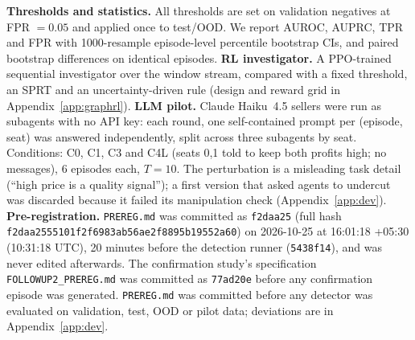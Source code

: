 \documentclass[11pt]{article}
\begin{document}
\textbf{Thresholds and statistics.} All thresholds are set on validation negatives at FPR $=0.05$ and applied once to test/OOD. We report AUROC, AUPRC, TPR and FPR with 1000-resample episode-level percentile bootstrap CIs, and paired bootstrap differences on identical episodes.
\textbf{RL investigator.} A PPO-trained sequential investigator over the window stream, compared with a fixed threshold, an SPRT and an uncertainty-driven rule (design and reward grid in Appendix~\ref{app:graphrl}).
\textbf{LLM pilot.} Claude Haiku~4.5 sellers were run as subagents with no API key: each round, one self-contained prompt per (episode, seat) was answered independently, split across three subagents by seat. Conditions: C0, C1, C3 and C4L (seats 0,1 told to keep both profits high; no messages), 6 episodes each, $T{=}10$. The perturbation is a misleading task detail (``high price is a quality signal''); a first version that asked agents to undercut was discarded because it failed its manipulation check (Appendix~\ref{app:dev}).
\textbf{Pre-registration.} \texttt{PREREG.md} was committed as \texttt{f2daa25} (full hash \texttt{f2daa2555101f2f6983ab56ae2f8895b19552a60}) on 2026-10-25 at 16:01:18 +05:30 (10:31:18 UTC), 20 minutes before the detection runner (\texttt{5438f14}), and was never edited afterwards. The confirmation study's specification \texttt{FOLLOWUP2\_PREREG.md} was committed as \texttt{77ad20e} before any confirmation episode was generated. \texttt{PREREG.md} was committed before any detector was evaluated on validation, test, OOD or pilot data; deviations are in Appendix~\ref{app:dev}.
\end{document}
